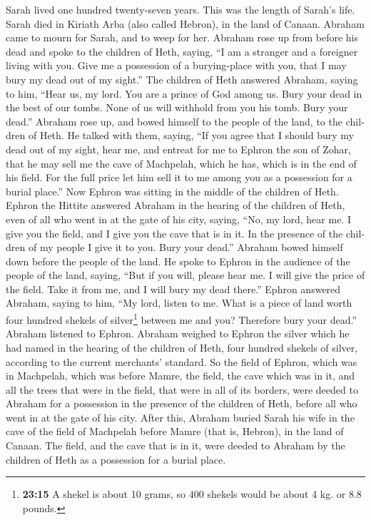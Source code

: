 \begin{paracol}{2}
\begin{otherlanguage}{english}
 Sarah lived one hundred twenty-seven years. This was the
length of Sarah's life.  Sarah died in Kiriath Arba (also
called Hebron), in the land of Canaan. Abraham came to mourn for Sarah,
and to weep for her.  Abraham rose up from before his dead
and spoke to the children of Heth, saying,  ``I am a
stranger and a foreigner living with you. Give me a possession of a
burying-place with you, that I may bury my dead out of my sight.''
 The children of Heth answered Abraham, saying to him,
 ``Hear us, my lord. You are a prince of God among us.
Bury your dead in the best of our tombs. None of us will withhold from
you his tomb. Bury your dead.''  Abraham rose up, and
bowed himself to the people of the land, to the children of Heth.
 He talked with them, saying, ``If you agree that I should
bury my dead out of my sight, hear me, and entreat for me to Ephron the
son of Zohar,  that he may sell me the cave of Machpelah,
which he has, which is in the end of his field. For the full price let
him sell it to me among you as a possession for a burial place.''
 Now Ephron was sitting in the middle of the children of
Heth. Ephron the Hittite answered Abraham in the hearing of the children
of Heth, even of all who went in at the gate of his city, saying,
 ``No, my lord, hear me. I give you the field, and I give
you the cave that is in it. In the presence of the children of my people
I give it to you. Bury your dead.''  Abraham bowed
himself down before the people of the land.  He spoke to
Ephron in the audience of the people of the land, saying, ``But if you
will, please hear me. I will give the price of the field. Take it from
me, and I will bury my dead there.''  Ephron answered
Abraham, saying to him,  ``My lord, listen to me. What is
a piece of land worth four hundred shekels of silver\footnote{\textbf{23:15}
  A shekel is about 10 grams, so 400 shekels would be about 4 kg. or 8.8
  pounds.} between me and you? Therefore bury your dead.''
 Abraham listened to Ephron. Abraham weighed to Ephron
the silver which he had named in the hearing of the children of Heth,
four hundred shekels of silver, according to the current merchants'
standard.  So the field of Ephron, which was in
Machpelah, which was before Mamre, the field, the cave which was in it,
and all the trees that were in the field, that were in all of its
borders, were deeded  to Abraham for a possession in the
presence of the children of Heth, before all who went in at the gate of
his city.  After this, Abraham buried Sarah his wife in
the cave of the field of Machpelah before Mamre (that is, Hebron), in
the land of Canaan.  The field, and the cave that is in
it, were deeded to Abraham by the children of Heth as a possession for a
burial place.


\end{otherlanguage}
\end{paracol}

